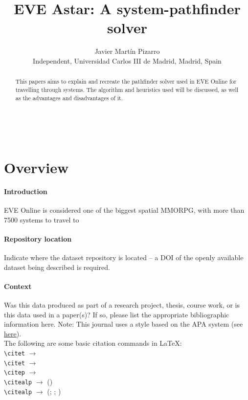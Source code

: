 \documentclass{article}
\title{EVE Astar: A system-pathfinder solver}
\author{Javier Martín Pizarro\\
        \small Independent, Universidad Carlos III de Madrid, Madrid, Spain \\}
\begin{document}
\maketitle

\begin{abstract} 
\noindent This papers aims to explain and recreate the pathfinder solver used in EVE Online for travelling through systems. The algorithm and heuristics used will be discussed, as well as the advantages and disadvantages of it. \end{abstract}

\noindent{}\\

\section{Overview}
\paragraph{Introduction} EVE Online is considered one of the biggest spatial MMORPG, with more than 7500 systems to travel to
\paragraph{Repository location} Indicate where the dataset repository is located – a DOI of the openly available dataset being described is required.
\paragraph{Context} Was this data produced as part of a research project, thesis, course work, or is this data used in a paper(s)? If so, please list the appropriate bibliographic information here. Note: This journal uses a style based on the APA system (see \href{https://openhumanitiesdata.metajnl.com/about/submissions/#References}{here}).\\

\noindent The following are some basic citation commands in \LaTeX: \\

\noindent
\verb|\citet| $\rightarrow$ \citet{jenset&mcgil}\\
\verb|\citet| $\rightarrow$ \citet{shree-a}\\
\verb|\citep| $\rightarrow$ \citep{fabricius-hansen2012b}\\
\verb|\citealp| $\rightarrow$ (\citealp{eckhoff2018a})\\
\verb|\citealp| $\rightarrow$ (\citealp{eckhoff2018a}; \citealp{fabricius-hansen2012b}; \citealp{shree-a})\\
\end{document}
